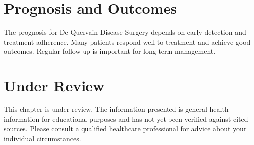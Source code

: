\section*{Prognosis and Outcomes}
The prognosis for De Quervain Disease Surgery depends on early detection and treatment adherence. Many patients respond well to treatment and achieve good outcomes. Regular follow-up is important for long-term management.
\section*{Under Review}
This chapter is under review. The information presented is general health information for educational purposes and has not yet been verified against cited sources. Please consult a qualified healthcare professional for advice about your individual circumstances.


\clearpage
